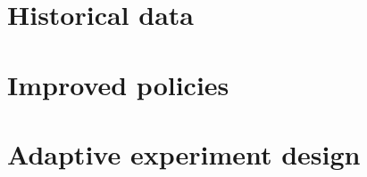 




\maketitle

\section{Historical data}



\section{Improved policies}



\section{Adaptive experiment design}



